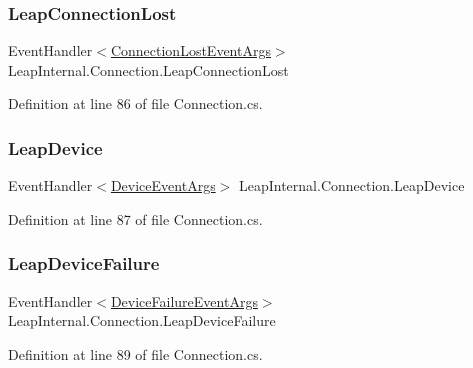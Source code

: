 \subsubsection{\texorpdfstring{LeapConnectionLost}{LeapConnectionLost}}
{\footnotesize\ttfamily Event\+Handler$<$\mbox{\hyperlink{class_leap_1_1_connection_lost_event_args}{Connection\+Lost\+Event\+Args}}$>$ Leap\+Internal.\+Connection.\+Leap\+Connection\+Lost}



Definition at line 86 of file Connection.\+cs.

\mbox{\label{class_leap_internal_1_1_connection_ae1dd18505f75a72eea2abbeab57d7d01}} 
\subsubsection{\texorpdfstring{LeapDevice}{LeapDevice}}
{\footnotesize\ttfamily Event\+Handler$<$\mbox{\hyperlink{class_leap_1_1_device_event_args}{Device\+Event\+Args}}$>$ Leap\+Internal.\+Connection.\+Leap\+Device}



Definition at line 87 of file Connection.\+cs.

\mbox{\label{class_leap_internal_1_1_connection_a8f5dd0ee804342d59a2a28046a2c0e44}} 
\subsubsection{\texorpdfstring{LeapDeviceFailure}{LeapDeviceFailure}}
{\footnotesize\ttfamily Event\+Handler$<$\mbox{\hyperlink{class_leap_1_1_device_failure_event_args}{Device\+Failure\+Event\+Args}}$>$ Leap\+Internal.\+Connection.\+Leap\+Device\+Failure}



Definition at line 89 of file Connection.\+cs.

\mbox{\label{class_leap_internal_1_1_connection_a3c55a469e21efe1ceb92b90c636f9f67}} 
